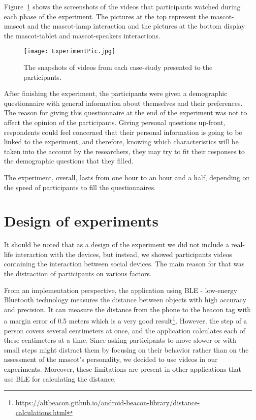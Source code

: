 Figure~\ref{fig:ExperimentPic} shows the screenshots of the videos that
participants watched during each phase of the experiment.
The pictures at the top represent the mascot-mascot and the mascot-lamp interaction
and the pictures at the bottom display the mascot-tablet and mascot-speakers interactions.

\begin{figure}[hbt!]
  \centering
  \texttt{[image: ExperimentPic.jpg]}
  \caption[]{The snapshots of videos from each case-study presented to the participants\footnotemark.}
  \label{fig:ExperimentPic}
\end{figure}

After finishing the experiment, the participants were given a demographic questionnaire
with general information about themselves and their preferences.
The reason for giving this questionnaire at the end of the experiment was
not to affect the opinion of the participants.
Giving personal questions up-front, respondents could feel concerned that their personal
information is going to be linked to the experiment, and therefore, knowing which
characteristics will be taken into the account by the researchers, they may try
to fit their responses to the demographic questions that they filled.

The experiment, overall, lasts from one hour to an hour and a half, depending
on the speed of participants to fill the questionnaires.

\section{Design of experiments}
\label{sec:design-of-experiments}

It should be noted that as a design of the experiment we did not include a
real-life interaction with the devices, but instead, we showed participants videos
containing the interaction between social devices.
The main reason for that was the distraction of participants on various factors.

From an implementation perspective, the application using BLE - low-energy Bluetooth
technology measures the distance between objects with high accuracy and precision.
It can measure the distance from the phone to the beacon tag with
a margin error of 0.5 meters which is a
very good result\footnote{\url{https://altbeacon.github.io/android-beacon-library/distance-calculations.html}}.
However, the step of a person covers several centimeters at once, and the
application calculates each of these centimeters at a time.
Since asking participants to move slower or with small steps might distract
them by focusing on their behavior rather than on the assessment of the
mascot's personality, we decided to use videos in our experiments.
Moreover, these limitations are present in other applications that use BLE for calculating the distance.

